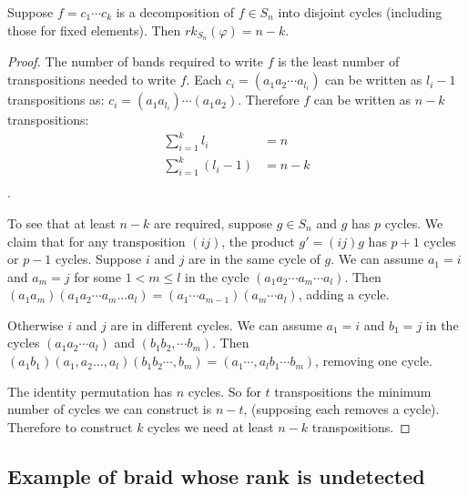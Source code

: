 \documentclass[12pt]{thesis}
\begin{document}
\begin{proposition}
    Suppose $f = c_{1} \cdots c_{k}$ is a decomposition
    of $f \in S_{n}$ into disjoint cycles (including those for fixed elements).
    Then $rk_{S_{n}}(\varphi) = n - k$.
\end{proposition}

\begin{proof}
    The number of bands required to write $f$
    is the least number of transpositions needed
    to write $f$.
    Each $c_{i} = (a_{1} a_{2} \cdots a_{l_{i}})$ can be written
    as $l_{i} - 1$  transpositions
    as: $c_{i} = (a_{1}a_{l_{i}}) \cdots (a_{1} a_{2})$.
    Therefore $f$ can be written as $n - k$ transpositions:
    \[
    \begin{split}
        \sum_{i=1}^{k} l_{i} &= n  \\
        \sum_{i=1}^{k} (l_{i} - 1) &= n - k \\
    \end{split}
    \].

    To see that at least $n - k$ are required, suppose $g \in S_{n}$
    and $g$ has $p$ cycles.
    We claim that for any transposition $(i j)$,
    the product $g' = (i j)g$ has $p+1$ cycles 
    or $p - 1$ cycles.
    Suppose $i$ and $j$ are in the same cycle of $g$.
    We can assume $a_{1} = i$ and $a_{m} = j$ for some $1 < m \leq l$ in the cycle $(a_{1} a_{2} \cdots a_{m} \cdots a_{l})$.
    Then $(a_{1} a_{m}) (a_{1} a_{2} \cdots a_{m} \ldots a_{l}) = (a_{1} \cdots a_{m - 1}) (a_{m} \cdots a_{l})$,
    adding a cycle.

    Otherwise $i$ and $j$ are in different cycles.
    We can assume $a_{1} = i$ and $b_{1} = j$ in the cycles $(a_{1} a_{2} \cdots a_{l})$
    and $(b_{1} b_{2}, \cdots b_{m})$.
    Then $(a_{1} b_{1}) (a_{1}, a_{2} \ldots, a_{l}) (b_{1} b_{2} \cdots, b_{m})
    = (a_{1} \cdots, a_{l}b_{1} \cdots b_{m})$,
    removing one cycle.

    The identity permutation has $n$ cycles.
    So for $t$ transpositions the minimum number of
    cycles we can construct is $n - t$,
    (supposing each removes a cycle).
    Therefore to construct $k$ cycles
    we need at least $n - k$ transpositions.
\end{proof}

\subsection{Example of braid whose rank is undetected}
\end{document}
